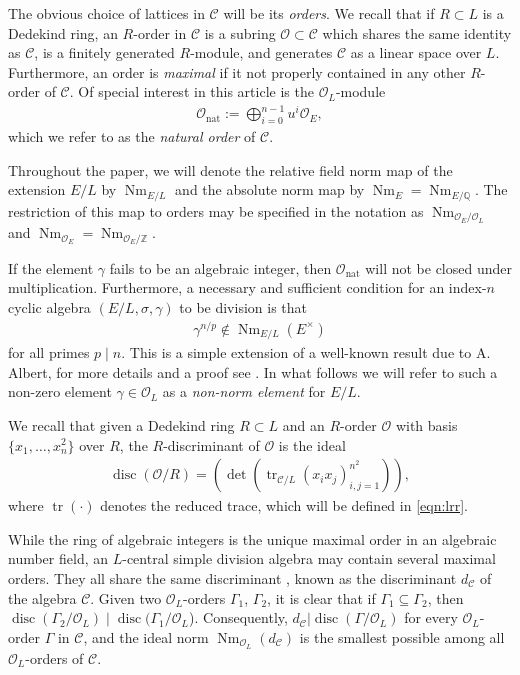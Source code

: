 \documentclass[smallextended]{svjour3}
\newcommand{\Q}{\mathbb{Q}}
\newcommand{\Z}{\mathbb{Z}}
\newcommand{\mce}{\Or_{E}}
\newcommand{\mcl}{\Or_{L}}
\newcommand{\mcc}{\mathcal{C}}
\newcommand{\Or}{\mathcal{O}}
\DeclareMathOperator{\Nm}{Nm}
\DeclareMathOperator{\nat}{nat}
\DeclareMathOperator{\disc}{disc}
\DeclareMathOperator{\tr}{tr}
\begin{document}
The obvious choice of lattices in $\mcc$ will be its \emph{orders}. We recall that if $R \subset L$ is a Dedekind ring, an $R$-order in $\mcc$ is a subring $\Or \subset \mcc$ which shares the same identity as $\mcc$, is a finitely generated $R$-module, and generates $\mcc$ as a linear space over $L$. Furthermore, an order is \emph{maximal} if it not properly contained in any other $R$-order of $\mcc$. Of special interest in this article is the $\mcl$-module
\begin{align*}
	\Or_{\nat} := \bigoplus\limits_{i=0}^{n-1}{u^i\mce},
\end{align*}
which we refer to as the \emph{natural order} of $\mcc$. 

Throughout the paper, we will denote the relative field norm map of the extension $E/L$ by $\Nm_{E/L}$ and the absolute norm map  by $\Nm_E=\Nm_{E/\Q}$. The restriction of this map to orders may be specified in the notation as $\Nm_{\Or_E/\Or_L}$ and $\Nm_{\Or_E}=\Nm_{\Or_E/\Z}$.

If the element $\gamma$ fails to be an algebraic integer, then $\Or_{\nat}$ will not be closed under multiplication. Furthermore, a necessary and sufficient condition for an index-$n$ cyclic algebra $(E/L,\sigma,\gamma)$ to be division is that
\begin{align}
\label{eqn:non_norm}
	\gamma^{n/p} \notin \Nm_{E/L}(E^\times)
\end{align} 
for all primes $p \mid n$. This is a simple extension of a well-known result due to A. Albert, for more details and a proof see  \cite[Prop. 3.6]{VHLR}. In what follows we will refer to such a non-zero element $\gamma \in \mcl$ as a \emph{non-norm element} for $E/L$.  

\begin{remark}
We recall that given a Dedekind ring $R \subset L$ and an $R$-order $\Or$ with basis $\{x_1,\ldots, x_n^2\}$ over $R$, the $R$-discriminant of $\Or$ is the ideal  
\begin{align*}
	\disc(\Or/R) = \left(\det\left(\tr_{\mcc/L}(x_i x_j)_{i,j=1}^{n^2}\right)\right),
\end{align*}
where $\tr(\cdot)$ denotes the reduced trace, which will be defined in \eqref{eqn:lrr}.

While the ring of algebraic integers is the unique maximal order in an algebraic number field, an $L$-central simple division algebra may contain several maximal orders. They all share the same discriminant \cite[Thm.~25.3]{Re}, known as the discriminant $d_{\mcc}$ of the  algebra ${\mcc}$. Given two $\mcl$-orders $\Gamma_1$, $\Gamma_2$, it is clear that if $\Gamma_1\subseteq\Gamma_2$, then $\disc(\Gamma_2/\mcl) \mid \disc(\Gamma_1/\mcl$). Consequently, $d_{\mcc}|\disc(\Gamma/\mcl)$ for every $\mcl$-order $\Gamma$ in ${\mcc}$, and the ideal norm $\Nm_{\mcl}(d_{\mcc})$ is the smallest possible among all  $\mcl$-orders of $\mcc$.
\end{remark}
\end{document}
